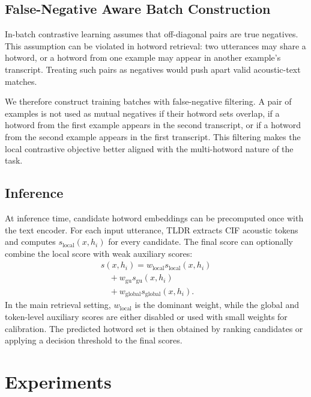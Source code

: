 \documentclass[letterpaper]{article} %
\begin{document}
\subsection{False-Negative Aware Batch Construction}

In-batch contrastive learning assumes that off-diagonal pairs are true negatives. This assumption can be violated in hotword retrieval: two utterances may share a hotword, or a hotword from one example may appear in another example's transcript. Treating such pairs as negatives would push apart valid acoustic-text matches.

We therefore construct training batches with false-negative filtering. A pair of examples is not used as mutual negatives if their hotword sets overlap, if a hotword from the first example appears in the second transcript, or if a hotword from the second example appears in the first transcript. This filtering makes the local contrastive objective better aligned with the multi-hotword nature of the task.

\subsection{Inference}

At inference time, candidate hotword embeddings can be precomputed once with the text encoder. For each input utterance, TLDR extracts CIF acoustic tokens and computes $s_{\mathrm{local}}(x,h_i)$ for every candidate. The final score can optionally combine the local score with weak auxiliary scores:
\begin{equation}
	\begin{array}{l}
		s(x,h_i)=w_{\mathrm{local}}s_{\mathrm{local}}(x,h_i) \\
		\quad + w_{\mathrm{gu}}s_{\mathrm{gu}}(x,h_i)        \\
		\quad + w_{\mathrm{global}}s_{\mathrm{global}}(x,h_i).
	\end{array}
\end{equation}
In the main retrieval setting, $w_{\mathrm{local}}$ is the dominant weight, while the global and token-level auxiliary scores are either disabled or used with small weights for calibration. The predicted hotword set is then obtained by ranking candidates or applying a decision threshold to the final scores.

\section{Experiments}
\end{document}

